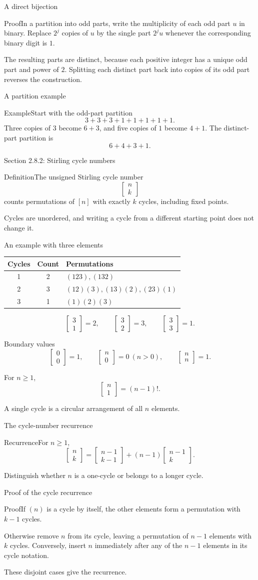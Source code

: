 \documentclass[aspectratio=169,11pt]{beamer}
\newcommand{\Def}[2]{\begin{block}{#1}#2\end{block}}
\newcommand{\Thm}[2]{\begin{block}{#1}#2\end{block}}
\renewcommand{\Proof}[1]{\begin{block}{Proof}\normalsize #1\end{block}}
\renewcommand{\Example}[1]{\begin{block}{Example}#1\end{block}}
\newcommand{\cyc}[2]{\left[\begin{matrix}#1\\#2\end{matrix}\right]}
\newcommand{\gap}{\par\medskip}
\begin{document}
\begin{frame}{A direct bijection}
\large
\Proof{In a partition into odd parts, write the multiplicity of each odd part $u$ in binary. Replace $2^j$ copies of $u$ by the single part $2^ju$ whenever the corresponding binary digit is $1$.\gap The resulting parts are distinct, because each positive integer has a unique odd part and power of $2$. Splitting each distinct part back into copies of its odd part reverses the construction.}
\end{frame}
\begin{frame}{A partition example}
\large
\Example{Start with the odd-part partition
\[3+3+3+1+1+1+1+1.\]
Three copies of $3$ become $6+3$, and five copies of $1$ become $4+1$. The distinct-part partition is
\[6+4+3+1.\]}
\end{frame}
\begin{frame}{Section 2.8.2: Stirling cycle numbers}
\large
\Def{Definition}{The unsigned Stirling cycle number
\[\cyc nk\]
counts permutations of $[n]$ with exactly $k$ cycles, including fixed points.}
\gap Cycles are unordered, and writing a cycle from a different starting point does not change it.
\end{frame}
\begin{frame}{An example with three elements}
\large
\begin{center}\renewcommand{\arraystretch}{1.5}
\begin{tabular}{ccl}
Cycles & Count & Permutations\\\hline
1&2&$(123),(132)$\\
2&3&$(12)(3),(13)(2),(23)(1)$\\
3&1&$(1)(2)(3)$
\end{tabular}\end{center}
\[\cyc31=2,\qquad\cyc32=3,\qquad\cyc33=1.\]
\end{frame}
\begin{frame}{Boundary values}
\large
\[\cyc00=1,\qquad\cyc n0=0\ (n>0),\qquad\cyc nn=1.\]
\gap For $n\geq1$,
\[\cyc n1=(n-1)!.\]
\gap A single cycle is a circular arrangement of all $n$ elements.
\end{frame}
\begin{frame}{The cycle-number recurrence}
\large
\Thm{Recurrence}{For $n\geq1$,
\[\cyc nk=\cyc{n-1}{k-1}+(n-1)\cyc{n-1}k.\]}
\gap Distinguish whether $n$ is a one-cycle or belongs to a longer cycle.
\end{frame}
\begin{frame}{Proof of the cycle recurrence}
\large
\Proof{If $(n)$ is a cycle by itself, the other elements form a permutation with $k-1$ cycles.\gap Otherwise remove $n$ from its cycle, leaving a permutation of $n-1$ elements with $k$ cycles. Conversely, insert $n$ immediately after any of the $n-1$ elements in its cycle notation.\gap These disjoint cases give the recurrence.}
\end{frame}
\end{document}
